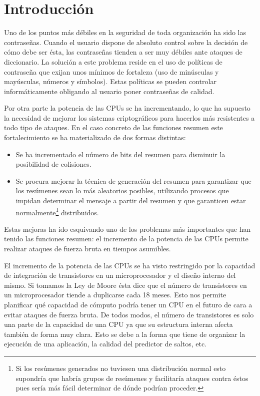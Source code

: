\chapter{Introducción}

Uno de los puntos más débiles en la seguridad de toda organización ha sido las contraseñas. Cuando el usuario dispone de absoluto control sobre la decisión de cómo debe ser ésta, las contraseñas tienden a ser muy débiles ante ataques de diccionario. La solución a este problema reside en el uso de políticas de contraseña que exijan unos mínimos de fortaleza (uso de minúsculas y mayúsculas, números y símbolos). Estas políticas se pueden controlar informáticamente obligando al usuario poner contraseñas de calidad.

Por otra parte la potencia de las CPUs se ha incrementando, lo que ha supuesto la necesidad de mejorar los sistemas criptográficos para hacerlos más resistentes a todo tipo de ataques. En el caso concreto de las funciones resumen este fortalecimiento se ha materializado de dos formas distintas:

\begin{itemize}
	\item Se ha incrementado el número de bits del resumen para disminuir la posibilidad de colisiones.
	
	\item Se procura mejorar la técnica de generación del resumen para garantizar que los resúmenes sean lo más aleatorios posibles, utilizando procesos que impidan determinar el mensaje a partir del resumen y que garanticen estar normalmente\footnote{Si los resúmenes generados no tuviesen una distribución normal esto supondría que habría grupos de resúmenes y facilitaría ataques contra éstos pues sería más fácil determinar de dónde podrían proceder.} distribuidos. 
\end{itemize}

Estas mejoras ha ido esquivando uno de los problemas más importantes que han tenido las funciones resumen: el incremento de la potencia de las CPUs permite realizar ataques de fuerza bruta en tiempos asumibles.

El incremento de la potencia de las CPUs se ha visto restringido por la capacidad de integración de transistores en un microprocesador y el diseño interno del mismo. Si tomamos la Ley de Moore ésta dice que el número de transistores en un microprocesador tiende a duplicarse cada 18 meses. Esto nos permite planificar qué capacidad de cómputo podría tener un CPU en el futuro de cara a evitar ataques de fuerza bruta. De todos modos, el número de transistores es solo una parte de la capacidad de una CPU ya que su estructura interna afecta también de forma muy clara. Esto se debe a la forma que tiene de organizar la ejecución de una aplicación, la calidad del predictor de saltos, etc.

